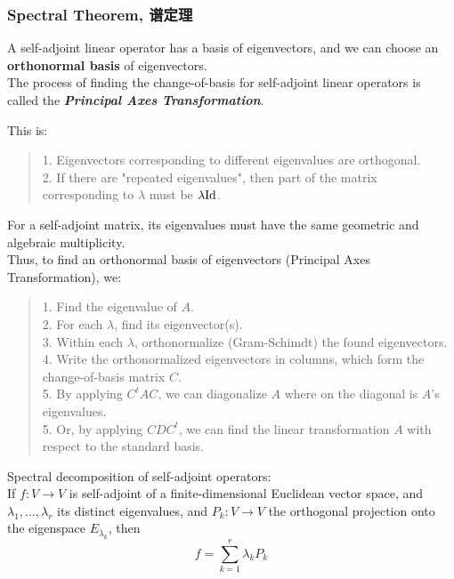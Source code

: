 \subsubsection{Spectral Theorem, 谱定理}
\begin{theorem}
    A self-adjoint linear operator has a basis of eigenvectors, and we can choose an \textbf{orthonormal basis} of eigenvectors. \\
    The process of finding the change-of-basis for self-adjoint linear operators is called the \textbf{\textit{Principal Axes Transformation}}.
\end{theorem}
This is:
\begin{quote}
    1. Eigenvectors corresponding to different eigenvalues are orthogonal. \\
    2. If there are "repeated eigenvalues", then part of the matrix corresponding to $\lambda$ must be $\lambda \text{Id}$.
\end{quote}
For a self-adjoint matrix, its eigenvalues must have the same geometric and algebraic multiplicity. \\
Thus, to find an orthonormal basis of eigenvectors (Principal Axes Transformation), we:
\begin{quote}
    1. Find the eigenvalue of $A$. \\
    2. For each $\lambda$, find its eigenvector(s). \\
    3. Within each $\lambda$, orthonormalize (Gram-Schimdt) the found eigenvectors. \\
    4. Write the orthonormalized eigenvectors in columns, which form the change-of-basis matrix $C$. \\
    5. By applying $C^tAC$, we can diagonalize $A$ where on the diagonal is $A$'s eigenvalues. \\
    5. Or, by applying $CDC^t$, we can find the linear transformation $A$ with respect to the standard basis.
\end{quote}
\begin{theorem}
    Spectral decomposition of self-adjoint operators: \\
    If $f: V \to V$ is self-adjoint of a finite-dimensional Euclidean vector space, and $\lambda_1, \dots, \lambda_r$ its distinct eigenvalues, and $P_k: V \to V$ the orthogonal projection onto the eigenspace $E_{\lambda_k}$, then
    $$f = \sum_{k=1}^r \lambda_k P_k$$
\end{theorem}